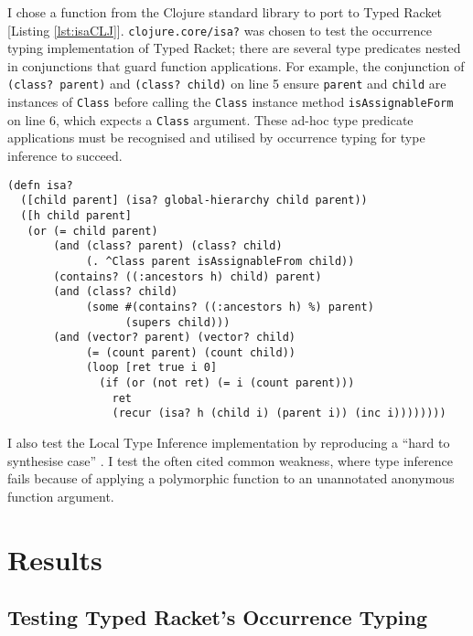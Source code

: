 \documentclass[12pt,a4paper]{article}
\begin{document}
I chose a function from the Clojure standard library to port to Typed Racket [Listing \ref{lst:isaCLJ}].
\lstinline|clojure.core/isa?| was chosen to test the occurrence
typing implementation of Typed Racket; there are several type predicates nested
in conjunctions that guard function applications. For example, the conjunction
of \lstinline|(class? parent)| and \lstinline|(class? child)| on line 5 ensure \lstinline|parent|
and \lstinline|child| are instances of \lstinline|Class| before calling the \lstinline|Class| instance
method \lstinline|isAssignableForm|
on line 6,
which expects a \lstinline|Class| argument. These ad-hoc type predicate applications must be recognised
and utilised by occurrence typing for type inference to succeed.

\begin{lstlisting}[caption=isa? Clojure Version, label=lst:isaCLJ]
(defn isa?
  ([child parent] (isa? global-hierarchy child parent))
  ([h child parent]
   (or (= child parent)
       (and (class? parent) (class? child)
            (. ^Class parent isAssignableFrom child))
       (contains? ((:ancestors h) child) parent)
       (and (class? child) 
            (some #(contains? ((:ancestors h) %) parent)
                  (supers child)))
       (and (vector? parent) (vector? child)
            (= (count parent) (count child))
            (loop [ret true i 0]
              (if (or (not ret) (= i (count parent)))
                ret
                (recur (isa? h (child i) (parent i)) (inc i))))))))
\end{lstlisting}

I also test the Local Type Inference implementation by reproducing
a ``hard to synthesise case'' \cite{Hosoya99howgood}.
I test the often cited common weakness, where type inference
fails because of applying a polymorphic function to an unannotated anonymous function
argument.


\section{Results}

\subsection{Testing Typed Racket's Occurrence Typing}
\end{document}
